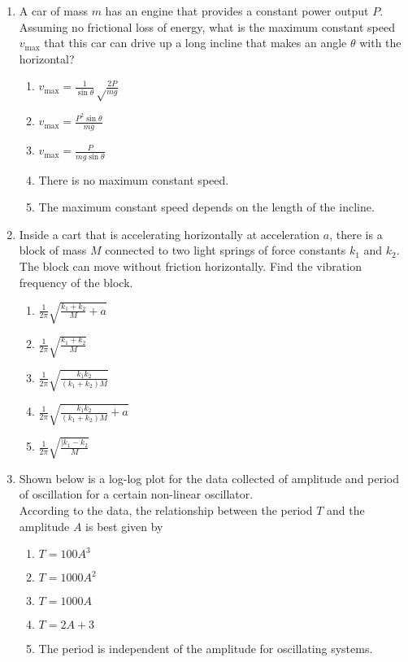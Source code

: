 \documentclass[12pt,letterpaper]{article}
\begin{document}
\begin{enumerate}[resume]
\item
A car of mass $m$ has an engine that provides a constant power output $P$. Assuming no frictional loss of energy, what is the maximum constant speed $v_\text{max}$ that this car can drive up a long incline that makes an angle $\theta$ with the horizontal?
\begin{enumerate}
\item $\displaystyle v_\text{max} = \frac{1}{\sin\theta}\sqrt\frac{2P}{mg}$
\item $\displaystyle v_\text{max} = \frac{P^2\sin\theta}{mg}$
\item $\displaystyle v_\text{max} = \frac{P}{mg\sin\theta}$
\item There is no maximum constant speed.
\item The maximum constant speed depends on the length of the incline.
\end{enumerate}

\item
Inside a cart that is accelerating horizontally at acceleration $a$, there is a block of mass $M$ connected to two light springs of force constants $k_1$ and $k_2$. The block can move without friction horizontally. Find the vibration frequency of the block.
\begin{enumerate}
\item $\displaystyle \frac{1}{2\pi}\sqrt{\frac{k_1+k_2}{M}+a}$
\item $\displaystyle \frac{1}{2\pi}\sqrt{\frac{k_1+k_2}{M}}$
\item $\displaystyle \frac{1}{2\pi}\sqrt{\frac{k_1k_2}{(k_1+k_2)M}}$
\item $\displaystyle \frac{1}{2\pi}\sqrt{\frac{k_1k_2}{(k_1+k_2)M}+a}$
\item $\displaystyle \frac{1}{2\pi}\sqrt{\frac{|k_1-k_2}{M}}$
\end{enumerate}

\item
Shown below is a log-log plot for the data collected of amplitude and period of oscillation for a certain non-linear oscillator.\\

According to the data, the relationship between the period $T$ and the amplitude $A$ is best given by
\begin{enumerate}
\item $T = 100A^3$
\item $T = 1000A^2$
\item $T = 1000A$
\item $T = 2A + 3$
\item The period is independent of the amplitude for oscillating systems.
\end{enumerate}


\end{enumerate}
\end{document}
